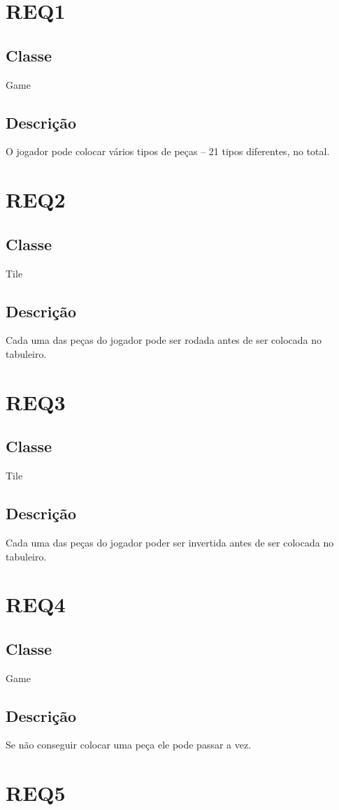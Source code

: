 \section{REQ1}
\subsection{Classe}
Game
\subsection{Descrição}
O jogador pode colocar vários tipos de peças – 21 tipos diferentes, no total.
\section{REQ2}
\subsection{Classe}
Tile
\subsection{Descrição}
Cada uma das peças do jogador pode ser rodada antes de ser colocada no tabuleiro.
\section{REQ3}
\subsection{Classe}
Tile
\subsection{Descrição}
Cada uma das peças do jogador poder ser invertida antes de ser colocada no tabuleiro.
\section{REQ4}
\subsection{Classe}
Game
\subsection{Descrição}
Se não conseguir colocar uma peça ele pode passar a vez.
\section{REQ5}
